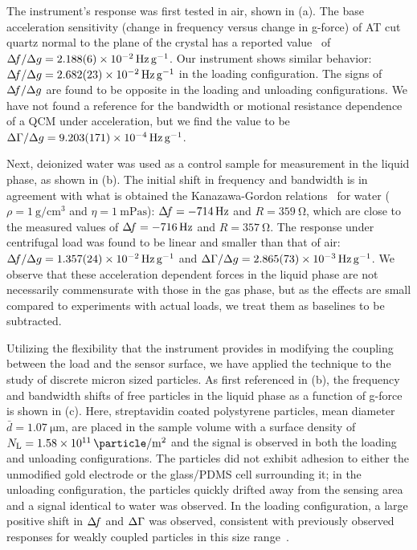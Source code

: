 The instrument's response was first tested in air, shown in
(a).  The base acceleration sensitivity (change in
frequency versus change in g-force) of AT cut quartz normal to the plane of
the crystal has a reported value~\cite{valdois2794influence} of $\df/\Delta
g =\SI{2.188+-0.006e-2}{\hertz\per\g}$.  Our instrument shows similar behavior:
$\df/\Delta g =\SI{2.682+-0.023e-2}{\hertz\per\g}$ in the loading
configuration.  The signs of $\Delta\!f/\Delta g$ are found to be opposite in the loading
and unloading configurations.  We have not found a reference for the
bandwidth or motional resistance dependence of a QCM under acceleration,
but we find the value to be $\dg/\Delta g = \SI{9.203+-0.171e-4}{\hertz\per\g}$.

Next, deionized water was used as a control sample for measurement in the
liquid phase, as shown in (b).  The initial shift in
frequency and bandwidth is in agreement with what is obtained the Kanazawa-Gordon
relations~\cite{kanazawa1985frequency} for water
($\rho=\SI{1}{\gram\per\centi\meter\cubed}$ and
$\eta=\SI{1}{\milli\pascal\second}$): $\Delta\!f = \SI{-714}{\hertz}$ and
$R=\SI{359}{\ohm}$, which are close to the measured values of $\Delta\!f =
\SI{-716}{\hertz}$ and $R=\SI{357}{\ohm}$.  The response under centrifugal
load was found to be linear and smaller than that of air: $\df/\Delta g=
\SI{1.357+-0.024e-2}{\hertz \per\g}$ and $\dg/\Delta g=
\SI{2.865+-0.073e-3}{\hertz\per\g}$.  We observe that these acceleration
dependent forces in the liquid phase are not necessarily commensurate with
those in the gas phase, but as the effects are small compared to
experiments with actual loads, we treat them as baselines to be
subtracted.

Utilizing the flexibility that the instrument provides in modifying the
coupling between the load and the sensor surface, we have applied the
technique to the study of discrete micron sized particles.  As first
referenced in (b), the frequency and bandwidth shifts
of free particles in the liquid phase as a function of g-force is shown in
(c).  Here, streptavidin coated polystyrene particles,
mean diameter $\bar{d}=\SI{1.07}{\micro\meter}$, are placed in the sample volume with
a surface density of
$N_\mathrm{L}=\SI{1.58e11}{\particle\per\meter\squared}$ and the signal is
observed in both the loading and unloading configurations.
The particles
did not exhibit adhesion to either the unmodified gold electrode or the
glass/PDMS cell surrounding it; in the unloading configuration, the particles
quickly drifted away from the sensing area and a signal identical to water
was observed.  In the loading configuration, a large positive
shift in $\Delta\!f$ and $\Delta\Gamma$ was observed, consistent with
previously observed responses for weakly coupled particles in this size
range~\cite{johannsman2007contacts}.  


